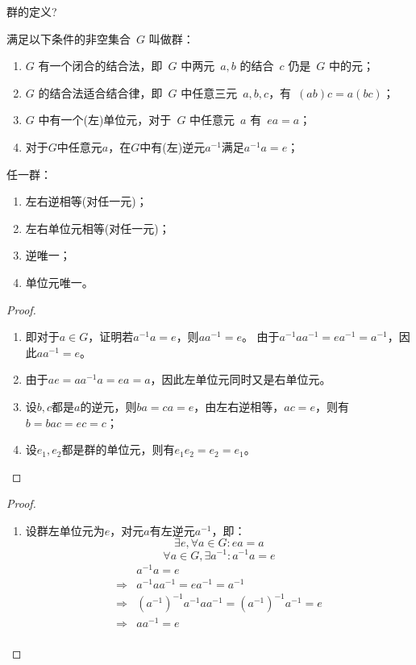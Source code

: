 \documentclass[twoside,openright]{book}
\begin{document}
\begin{CJK*}{UTF8}{}
\begin{quest}
群的定义?
\end{quest}
满足以下条件的非空集合\ $G$ 叫做群：
\begin{enumerate}
\item
$G$ 有一个闭合的结合法，即\ $G$ 中两元\ $a,b$ 的结合\ $c$ 仍是\ $G$ 中的元；
\item
$G$ 的结合法适合结合律，即\ $G$ 中任意三元\ $a,b,c$，有\ $(ab)c=a(bc)$；
\item
$G$ 中有一个(左)单位元，对于\ $G$ 中任意元\ $a$ 有\ $ea=a$；
\item
对于$G$中任意元$a$，在$G$中有(左)逆元$a^{-1}$满足$a^{-1}a=e$；
\end{enumerate}
\begin{lem}
\label{lem:group.property.1}
任一群：
\begin{enumerate}
\item
左右逆相等(对任一元)；
\item
左右单位元相等(对任一元)；
\item
逆唯一；
\item
单位元唯一。
\end{enumerate}
\end{lem}
\begin{proof}
$ $
\begin{enumerate}
\item 即对于$a \in G$，证明若$a^{-1}a=e$，则$aa^{-1}=e$。
由于$a^{-1}aa^{-1}=ea^{-1}=a^{-1}$，因此$aa^{-1}=e$。
\item 由于$ae=aa^{-1}a=ea=a$，因此左单位元同时又是右单位元。
\item 设$b,c$都是$a$的逆元，则$ba=ca=e$，由左右逆相等，$ac=e$，则有
$b=bac=ec=c$；
\item 设$e_1,e_2$都是群的单位元，则有$e_1e_2=e_2=e_1$。
\end{enumerate}
\end{proof}
%
\begin{proof}
$ $
\begin{enumerate}
\item
设群左单位元为$e$，对元$a$有左逆元$a^{-1}$，即：
\[
\exists e, \forall a \in G: e a = a
\]
\[
\forall a \in G, \exists a^{-1}: a^{-1} a = e
\]
\[
\begin{split}
& a^{-1} a = e \\
\Rightarrow & a^{-1} a a^{-1} = e a^{-1} = a^{-1} \\
\Rightarrow & (a^{-1})^{-1} a^{-1} a a^{-1} = (a^{-1})^{-1} a^{-1} = e \\
\Rightarrow & a a^{-1} = e \\

\end{split}\]
\end{enumerate}
\end{proof}
\end{CJK*}
\end{document}
